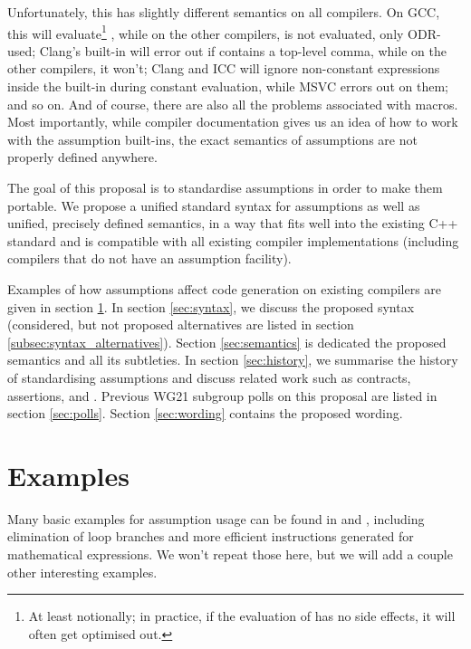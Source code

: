 Unfortunately, this has slightly different semantics on all compilers. On GCC, this will evaluate\footnote{At least notionally; in practice, if the evaluation of  has no side effects, it will often get optimised out.} , while on the other compilers,  is not evaluated, only ODR-used; Clang's built-in will error out if  contains a top-level comma, while on the other compilers, it won't; Clang and ICC will ignore non-constant expressions inside the built-in during constant evaluation, while MSVC errors out on them; and so on. And of course, there are also all the problems associated with macros. Most importantly, while compiler documentation gives us an idea of how to work with the assumption built-ins, the exact semantics of assumptions are not properly defined anywhere.

The goal of this proposal is to standardise assumptions in order to make them portable. We propose a unified standard syntax for assumptions as well as unified, precisely defined semantics, in a way that fits well into the existing C++ standard and is compatible with all existing compiler implementations (including compilers that do not have an assumption facility).

Examples of how assumptions affect code generation on existing compilers are given in section \ref{sec:examples}. In section \ref{sec:syntax}, we discuss the proposed syntax (considered, but not proposed alternatives are listed in section \ref{subsec:syntax_alternatives}). Section \ref{sec:semantics} is dedicated the proposed semantics and all its subtleties. In section \ref{sec:history}, we summarise the history of standardising assumptions and discuss related work such as contracts, assertions, and . Previous WG21 subgroup polls on this proposal are listed in section \ref{sec:polls}. Section \ref{sec:wording} contains the proposed wording.


\section{Examples}
\label{sec:examples}

Many basic examples for assumption usage can be found in \cite{Regehr2014} and \cite{P2064R0}, including elimination of loop branches and more efficient instructions generated for mathematical expressions. We won't repeat those here, but we will add a couple other interesting examples.

